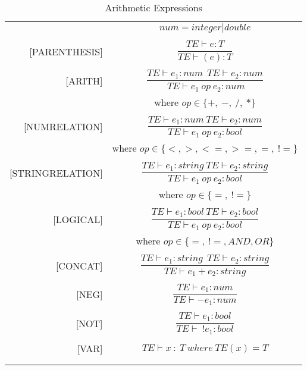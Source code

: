 \begin{longtable}[c] { r c }
  \centering

  & \(num = integer | double\) \\
  & \\

  [PARENTHESIS] & \(
    \dfrac{T E \vdash  e : T}{T E \vdash  (e) : T} \) \\
  & \\

  [ARITH] & \(
  \dfrac{TE \vdash e_{1} :  num \ \ TE \vdash e_{2} : num} 
    {\ TE \vdash e_{1} \ op \ e_{2} : num} \) \\
  & where \( op \in \{+, \ -, \ /, \ *\} \) \\
  & \\

  [NUMRELATION] & \(
  \dfrac{T E \vdash  e_1 : num \ T E \vdash  e_2 : num}
    {T E \vdash  e_1 \ op \ e_2 : bool} \) \\
  & where \( op \in \{<, >, < =, >=, =, \ !=\} \) \\
  & \\

  [STRINGRELATION] & \(
  \dfrac{T E \vdash  e_1 : string \ TE \vdash  e_2 : string }
    {TE \vdash  e_1 \ op \ e_2 : bool} \) \\
  & where \( op \in \{=, \ !=\} \) \\
  & \\

  [LOGICAL] & \(
  \dfrac{T E \vdash  e_1 : bool \ TE \vdash  e_2 : bool }
    {T E \vdash  e_1 \ op \ e_2 : bool} \) \\
  & where \( op \in \{=, \ !=, AND, OR\} \) \\
  & \\

  [CONCAT] & \(
  \dfrac{TE \vdash  e_1 : string \ \ TE \vdash  e_2 : string }
    {TE \vdash  e_1 + e_2 : string} \) \\
  & \\

  [NEG] & \(
  \dfrac{T E \vdash  e_1 : num}
    {T E \vdash -e_1 : num} \) \\
  & \\

  [NOT] & \(
  \dfrac{T E \vdash  e_1 : bool}
    {T E \vdash \ !e_1 : bool} \) \\
  & \\

  [VAR] & \(
  {TE \vdash x\ :\ T}\ where\ {TE(x) = T} \) \\
  & \\

  \caption{Arithmetic Expressions}
\end{longtable}

